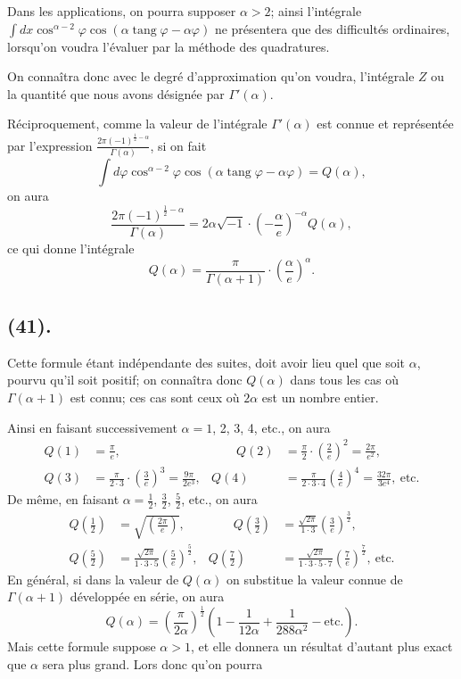 \documentclass{article}
\begin{document}
Dans les applications, on pourra supposer $\alpha>2$; ainsi l'intégrale $\displaystyle\int dx\cos^{\alpha-2}\varphi\cos(\alpha\operatorname{tang}\varphi-\alpha\varphi)$ ne présentera que des difficultés ordinaires, lorsqu'on voudra l'évaluer par la méthode des quadratures.

On connaîtra donc avec le degré d'approximation qu'on voudra, l'intégrale $Z$ ou la quantité que nous avons désignée par $\Gamma'(\alpha)$.

Réciproquement, comme la valeur de l'intégrale $\Gamma'(\alpha)$ est connue et représentée par l'expression $\frac{2\pi(-1)^{\frac{1}{2}-\alpha}}{\Gamma(\alpha)}$, si on fait
\[ \int d\varphi\cos^{\alpha-2}\varphi\cos(\alpha\operatorname{tang}\varphi-\alpha\varphi)=Q(\alpha), \]
on aura
\[ \frac{2\pi(-1)^{\frac{1}{2}-\alpha}}{\Gamma(\alpha)}=2\alpha\sqrt{-1}\cdot\left(-\frac{\alpha}{e}\right)^{-\alpha}Q(\alpha), \]
ce qui donne l'intégrale
\[ Q(\alpha)=\frac{\pi}{\Gamma(\alpha+1)}\cdot\left(\frac{\alpha}{e}\right)^{\alpha}. \tag{2} \]

\subsection*{(41).}

Cette formule étant indépendante des suites, doit avoir lieu quel que soit $\alpha$, pourvu qu'il soit positif; on connaîtra donc $Q(\alpha)$ dans tous les cas où $\Gamma(\alpha+1)$ est connu; ces cas sont ceux où $2\alpha$ est un nombre entier.

Ainsi en faisant successivement $\alpha=1$, 2, 3, 4, etc., on aura
\[ \begin{aligned} Q(1)&=\frac{\pi}{e}, &\qquad Q(2)&=\frac{\pi}{2}\cdot\left(\frac{2}{e}\right)^{2}=\frac{2\pi}{e^{2}},\\ Q(3)&=\frac{\pi}{2\cdot3}\cdot\left(\frac{3}{e}\right)^{3}=\frac{9\pi}{2e^{3}}, & Q(4)&=\frac{\pi}{2\cdot3\cdot4}\left(\frac{4}{e}\right)^{4}=\frac{32\pi}{3e^{4}},\ \text{etc.} \end{aligned} \]
De même, en faisant $\alpha=\frac{1}{2}$, $\frac{3}{2}$, $\frac{5}{2}$, etc., on aura
\[ \begin{aligned} Q\left(\frac{1}{2}\right)&=\sqrt{\left(\frac{2\pi}{e}\right)}, &\qquad Q\left(\frac{3}{2}\right)&=\frac{\sqrt{2\pi}}{1\cdot3}\left(\frac{3}{e}\right)^{\frac{3}{2}},\\ Q\left(\frac{5}{2}\right)&=\frac{\sqrt{2\pi}}{1\cdot3\cdot5}\left(\frac{5}{e}\right)^{\frac{5}{2}}, & Q\left(\frac{7}{2}\right)&=\frac{\sqrt{2\pi}}{1\cdot3\cdot5\cdot7}\left(\frac{7}{e}\right)^{\frac{7}{2}},\ \text{etc.} \end{aligned} \]
En général, si dans la valeur de $Q(\alpha)$ on substitue la valeur connue de $\Gamma(\alpha+1)$ développée en série, on aura
\[ Q(\alpha)=\left(\frac{\pi}{2\alpha}\right)^{\frac{1}{2}}\left(1-\frac{1}{12\alpha}+\frac{1}{288\alpha^{2}}-\text{etc.}\right). \tag{3} \]
Mais cette formule suppose $\alpha>1$, et elle donnera un résultat d'autant plus exact que $\alpha$ sera plus grand. Lors donc qu'on pourra
\end{document}
